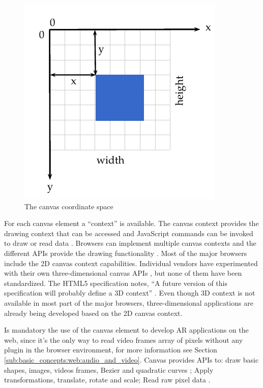  \begin{figure}[!htb]
   \centering
   \includegraphics{chapters/basic_concepts/canvas_axis.pdf}
   \caption{The canvas coordinate space}
   \label{figure:canvas_axis}
 \end{figure}

For each canvas element \cite{Canvas2013} a ``context'' is available. The canvas context provides the drawing context that can be accessed and JavaScript commands can be invoked to draw or read data \cite{Canvas2013}. Browsers can implement multiple canvas contexts and the different APIs provide the drawing functionality \cite{Canvas2013}. Most of the major browsers include the 2D canvas context capabilities. Individual vendors have experimented with their own three-dimensional canvas APIs \cite{Canvas2013}, but none of them have been standardized. The HTML5 \cite{Hickson2013} specification notes, ``A future version of this specification will probably define a 3D context'' \cite{Canvas2013}. Even though 3D context is not available in most part of the major browsers, three-dimensional applications are already being developed based on the 2D canvas context.

Is mandatory the use of the canvas element \cite{Canvas2013} to develop AR applications on the web, since it's the only way to read video frames array of pixels without any plugin in the browser environment, for more information see Section \ref{sub:basic_concepts:web:audio_and_video}. Canvas provides APIs to: draw basic shapes, images, videos frames, Bezier \cite{piegl1993fundamental} and quadratic curves \cite{piegl1993fundamental} \cite{Hartley2004}; Apply transformations, translate, rotate and scale; Read raw pixel data \etc.

